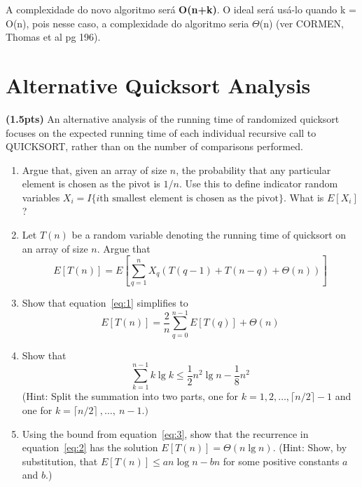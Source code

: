 \documentclass{article}
\begin{document}
A complexidade do novo algoritmo será \textbf{O(n+k)}. O ideal será usá-lo quando k = O(n), pois nesse caso, a complexidade do algoritmo seria $\Theta$(n) (ver CORMEN, Thomas et al pg 196). 
\section{Alternative Quicksort Analysis} 
\textbf{(1.5pts)} An alternative analysis of the running time of randomized quicksort focuses on the expected running time of each individual recursive call to QUICKSORT, rather than on the number of comparisons performed.

\begin{enumerate}[label=(\alph*)]
  \item Argue that, given an array of size $n$, the probability that any particular element is chosen as the pivot is $1/n$. Use this to define indicator random variables $X_i = I \{i\mbox{th smallest element is chosen as the pivot}\}$. What is $E[X_i]$?
  \item Let $T(n)$ be a random variable denoting the running time of quicksort on an array of size $n$. Argue that
  \begin{equation}
    E[T(n)]=E\left[\sum_{q=1}^{n}X_q(T(q-1)+T(n-q)+\Theta(n))\right]  
    \label{eq:1}
  \end{equation}
  
  \item Show that equation~\ref{eq:1} simplifies to
  \begin{equation}
    E[T(n)] = \frac{2}{n}\sum_{q=0}^{n-1}E[T(q)] + \Theta(n)
    \label{eq:2}
  \end{equation}

  \item Show that
  \begin{equation}
    \sum_{k=1}^{n-1} k \lg k \leq \frac{1}{2}n^2\lg n - \frac{1}{8}n^2
    \label{eq:3}
  \end{equation}
  (Hint: Split the summation into two parts, one for $k=1,2, \ldots, \lceil n/2 \rceil - 1$ and \\ one for $k=\lceil n/2 \rceil~,\ldots,~n-1.)$

  \item Using the bound from equation~\ref{eq:3}, show that the recurrence in equation~\ref{eq:2} has the solution $E[T(n)]=\Theta(n\lg n)$. (Hint: Show, by substitution, that $E[T(n)] \leq an \log n - bn$ for some positive constants $a$ and $b$.)
\end{enumerate}
\end{document}
